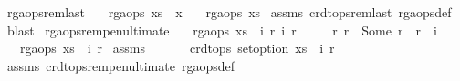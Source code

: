 \begin{isabellebody}
\isanewline
{}\isamarkupfalse%
\ rga{\isacharunderscore}ops{\isacharunderscore}rem{\isacharunderscore}last{\isacharcolon}\isanewline
\ \ \ {\isachardoublequoteopen}rga{\isacharunderscore}ops\ {\isacharparenleft}xs\ {\isacharat}\ {\isacharbrackleft}x{\isacharbrackright}{\isacharparenright}{\isachardoublequoteclose}\isanewline
\ \ \ {\isachardoublequoteopen}rga{\isacharunderscore}ops\ xs{\isachardoublequoteclose}\isanewline
%
\isadelimproof
%
\endisadelimproof
%
\isatagproof
{}\isamarkupfalse%
\ assms\ crdt{\isacharunderscore}ops{\isacharunderscore}rem{\isacharunderscore}last\ rga{\isacharunderscore}ops{\isacharunderscore}def\ \isamarkupfalse%
\ blast%
\endisatagproof
{\isafoldproof}%
%
\isadelimproof
\isanewline
%
\endisadelimproof
\isanewline
{}\isamarkupfalse%
\ rga{\isacharunderscore}ops{\isacharunderscore}rem{\isacharunderscore}penultimate{\isacharcolon}\isanewline
\ \ \ {\isachardoublequoteopen}rga{\isacharunderscore}ops\ {\isacharparenleft}xs\ {\isacharat}\ {\isacharbrackleft}{\isacharparenleft}i{}{\isacharcomma}\ r{}{\isacharparenright}{\isacharcomma}\ {\isacharparenleft}i{}{\isacharcomma}\ r{}{\isacharparenright}{\isacharbrackright}{\isacharparenright}{\isachardoublequoteclose}\isanewline
\ \ \ \ \ {\isachardoublequoteopen}{\isasymAnd}r{\isachardot}\ r{}\ {\isacharequal}\ Some\ r\ {\isasymLongrightarrow}\ r\ {\isasymnoteq}\ i{}{\isachardoublequoteclose}\isanewline
\ \ \ {\isachardoublequoteopen}rga{\isacharunderscore}ops\ {\isacharparenleft}xs\ {\isacharat}\ {\isacharbrackleft}{\isacharparenleft}i{}{\isacharcomma}\ r{}{\isacharparenright}{\isacharbrackright}{\isacharparenright}{\isachardoublequoteclose}\isanewline
%
\isadelimproof
%
\endisadelimproof
%
\isatagproof
{}\isamarkupfalse%
\ assms\ \isamarkupfalse%
\ {\isacharminus}\isanewline
\ \ \isamarkupfalse%
\ {\isachardoublequoteopen}crdt{\isacharunderscore}ops\ set{\isacharunderscore}option\ {\isacharparenleft}xs\ {\isacharat}\ {\isacharbrackleft}{\isacharparenleft}i{}{\isacharcomma}\ r{}{\isacharparenright}{\isacharbrackright}{\isacharparenright}{\isachardoublequoteclose}\isanewline
\ \ \ \ \isamarkupfalse%
\ assms\ crdt{\isacharunderscore}ops{\isacharunderscore}rem{\isacharunderscore}penultimate\ rga{\isacharunderscore}ops{\isacharunderscore}def\ \isamarkupfalse%

\end{isabellebody}

